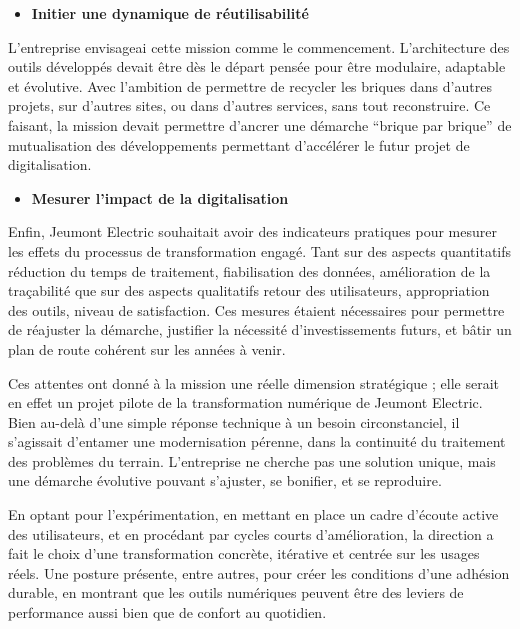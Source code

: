 \documentclass[11pt,a4paper]{article}
\begin{document}
\newpage
\begin{itemize}
    \item \textbf{Initier une dynamique de réutilisabilité}
\end{itemize}
L’entreprise envisageai cette mission comme le commencement. L’architecture des outils développés devait être dès le départ pensée pour être modulaire, adaptable et évolutive. Avec l’ambition de permettre de recycler les briques dans d’autres projets, sur d’autres sites, ou dans d’autres services, sans tout reconstruire. Ce faisant, la mission devait permettre d’ancrer une démarche “brique par brique” de mutualisation des développements permettant d’accélérer le futur projet de digitalisation.

\begin{itemize}
   \item \textbf{Mesurer l’impact de la digitalisation}
\end{itemize}
   Enfin, Jeumont Electric souhaitait avoir des indicateurs pratiques pour mesurer les effets du processus de transformation engagé. Tant sur des aspects quantitatifs réduction du temps de traitement, fiabilisation des données, amélioration de la traçabilité que sur des aspects qualitatifs retour des utilisateurs, appropriation des outils, niveau de satisfaction. Ces mesures étaient nécessaires pour permettre de réajuster la démarche, justifier la nécessité d’investissements futurs, et bâtir un plan de route cohérent sur les années à venir.
    
    
\vspace{0.5cm}
Ces attentes ont donné à la mission une réelle dimension stratégique ; elle serait en effet un projet pilote de la transformation numérique de Jeumont Electric. Bien au-delà d’une simple réponse technique à un besoin circonstanciel, il s’agissait d’entamer une modernisation pérenne, dans la continuité du traitement des problèmes du terrain. L’entreprise ne cherche pas une solution unique, mais une démarche évolutive pouvant s’ajuster, se bonifier, et se reproduire.

En optant pour l’expérimentation, en mettant en place un cadre d’écoute active des utilisateurs, et en procédant par cycles courts d’amélioration, la direction a fait le choix d’une transformation concrète, itérative et centrée sur les usages réels. Une posture présente, entre autres, pour créer les conditions d’une adhésion durable, en montrant que les outils numériques peuvent être des leviers de performance aussi bien que de confort au quotidien.
\end{document}
